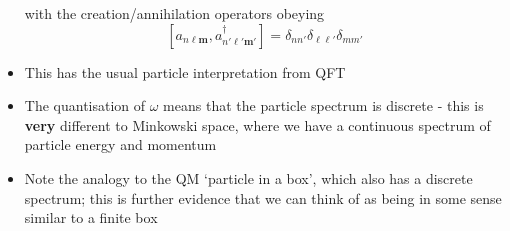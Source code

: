\documentclass[12pt,a4paper]{article}
\numberwithin{equation}{section}
\begin{document}
\begin{itemize}
\begin{equation}
		\end{equation}
		with the creation/annihilation operators obeying
		\begin{equation}
			\left[a_{n\ell\mathbf{m}},a_{n'\ell'\mathbf{m}'}^{\dagger}\right]=\delta_{nn'}\delta_{\ell\ell'}\delta_{mm'}
		\end{equation}
		\item This has the usual particle interpretation from QFT
		\item The quantisation of $\omega$ means that the particle spectrum is discrete - this is \textbf{very} different to Minkowski space, where we have a continuous spectrum of particle energy and momentum
		\item Note the analogy to the QM `particle in a box', which also has a discrete spectrum; this is further evidence that we can think of \ads as being in some sense similar to a finite box
	\end{itemize}
\end{document}
